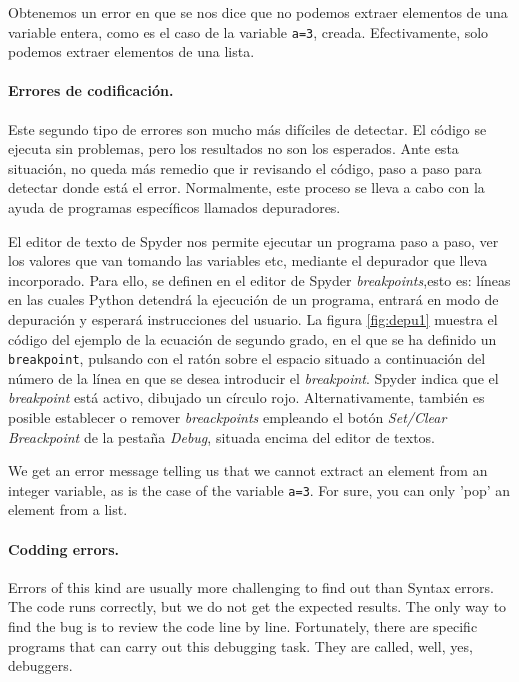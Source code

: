 \begin{paracol}{2}
Obtenemos un error en que se nos dice que no podemos extraer elementos de una variable entera, como es el caso de la variable \texttt{a=3}, creada. Efectivamente, solo podemos extraer elementos de una lista.

\paragraph{Errores de codificación.} Este segundo tipo de errores son mucho más difíciles de detectar. El código se ejecuta sin problemas, pero los resultados no son los esperados. Ante esta situación, no queda más remedio que ir revisando el código, paso a paso para detectar donde está el error. Normalmente, este proceso se lleva a cabo con la ayuda de programas específicos llamados depuradores.

El editor de texto de Spyder nos permite ejecutar un programa paso a paso, ver los valores que van tomando las variables etc, mediante el depurador que lleva incorporado. Para ello, se definen en el editor de Spyder \emph{breakpoints},esto es: líneas en las cuales Python detendrá la ejecución de un programa, entrará en modo de depuración y esperará instrucciones del usuario. La figura \ref{fig:depu1} muestra el código del ejemplo de la ecuación de segundo grado, en el que se ha definido un \texttt{breakpoint}, pulsando con el ratón sobre el espacio situado a continuación del número de la línea en que se desea  introducir el \emph{breakpoint}.  Spyder indica que el \emph{breakpoint} está activo, dibujado un círculo rojo. Alternativamente, también es posible establecer o remover \emph{breackpoints} empleando el botón \emph{Set/Clear Breackpoint} de la pestaña \emph{Debug}, situada encima del editor de textos.

\switchcolumn
We get an error message telling us that we cannot extract an element from an integer variable, as is the case of the variable \texttt{a=3}. For sure, you can only 'pop' an element from a list.

\paragraph{Codding errors.} Errors of this kind are usu\-ally more challenging to find out than Syntax errors. The code runs correctly, but we do not get the expected results. The only way to find the bug is to review the code line by line. Fortunately, there are specific programs that can carry out this debugging task. They are called, well, yes, debuggers.


\end{paracol}
